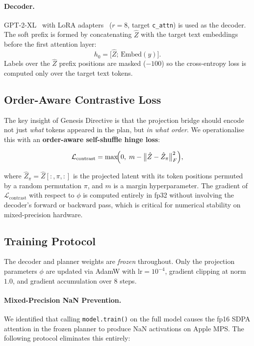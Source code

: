 \documentclass[11pt]{article}
\begin{document}
\paragraph{Decoder.}
GPT-2-XL~\citep{radford2019language} with LoRA adapters~\citep{hu2021lora}
($r=8$, target \texttt{c\_attn}) is used as the decoder.
The soft prefix is formed by concatenating $\hat{Z}$ with the target text
embeddings before the first attention layer:
\begin{equation}
  h_0 = \bigl[\hat{Z};\, \mathrm{Embed}(y)\bigr].
  \label{eq:softprefix}
\end{equation}
Labels over the $\hat{Z}$ prefix positions are masked ($-100$) so the
cross-entropy loss is computed only over the target text tokens.

\subsection{Order-Aware Contrastive Loss}
\label{sec:loss}

The key insight of Genesis Directive is that the projection bridge should encode
not just \emph{what} tokens appeared in the plan, but \emph{in what order}.
We operationalise this with an \textbf{order-aware self-shuffle hinge loss}:

\begin{equation}
  \mathcal{L}_\mathrm{contrast} =
  \max\!\Bigl(0,\;
    m - \bigl\|\hat{Z} - \hat{Z}_{\pi}\bigr\|_F^2
  \Bigr),
  \label{eq:loss}
\end{equation}

where $\hat{Z}_{\pi} = \hat{Z}[:, \pi, :]$ is the projected latent with its
token positions permuted by a random permutation $\pi$, and $m$ is a margin
hyperparameter.
The gradient of $\mathcal{L}_\mathrm{contrast}$ with respect to $\phi$ is
computed entirely in fp32 without involving the decoder's forward or backward
pass, which is critical for numerical stability on mixed-precision hardware.

\subsection{Training Protocol}
\label{sec:training}

The decoder and planner weights are \emph{frozen} throughout.
Only the projection parameters $\phi$ are updated via AdamW with
$\mathrm{lr} = 10^{-4}$, gradient clipping at norm $1.0$, and gradient
accumulation over 8 steps.

\paragraph{Mixed-Precision NaN Prevention.}
We identified that calling \texttt{model.train()} on the full model causes
the fp16 SDPA attention in the frozen planner to produce NaN activations on
Apple MPS.
The following protocol eliminates this entirely:
\end{document}
